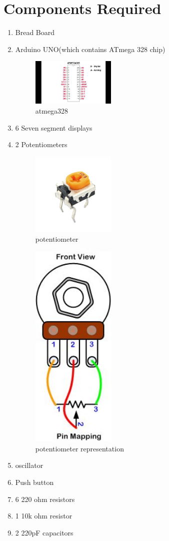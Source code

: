 \documentclass{article}
\begin{document}
\section{\textbf{Components Required}}
\begin{enumerate}
\item Bread Board
\item Arduino UNO(which contains ATmega 328 chip)
\begin{figure}[htp]
\centering
\includegraphics[width=4cm]{atmega}

\caption{atmega328}
\end{figure}

\item 6 Seven segment displays
\item 2 Potentiometers
\begin{figure}[htp]
\centering
\includegraphics[width=4cm]{potentiometer2}

\label{fig:potentiometer2}
\caption{potentiometer}
\end{figure}
\begin{figure}[htp]
\centering
\includegraphics[width=4cm]{potentiometer}
\caption{potentiometer representation}
\label{fig:potentiometer }
\end{figure}
 \item oscillator
\item Push button
\item 6  220 ohm resistors
\item 1 10k ohm resistor
\item 2  220pF capacitors
\end{enumerate}
\end{document}
